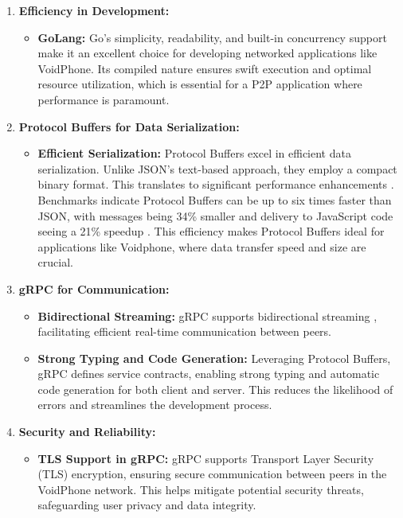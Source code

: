 \begin{enumerate}
    \item \textbf{Efficiency in Development:}
    \begin{itemize}
        \item \textbf{GoLang:} Go's simplicity, readability, and built-in concurrency support make it an excellent choice for developing networked applications like VoidPhone. Its compiled nature ensures swift execution and optimal resource utilization, which is essential for a P2P application where performance is paramount.
    \end{itemize}
    
    \item \textbf{Protocol Buffers for Data Serialization:}
    \begin{itemize}
        \item \textbf{Efficient Serialization:} Protocol Buffers excel in efficient data serialization. Unlike JSON's text-based approach, they employ a compact binary format. This translates to significant performance enhancements \parencite{hardwareAcceleratorProtocolBuffers}. Benchmarks indicate Protocol Buffers can be up to six times faster than JSON, with messages being 34\% smaller and delivery to JavaScript code seeing a 21\% speedup \parencite{beatingJSONWithProtobuf}. This efficiency makes Protocol Buffers ideal for applications like Voidphone, where data transfer speed and size are crucial.
    \end{itemize}
    
    \item \textbf{gRPC for Communication:}
    \begin{itemize}
        \item \textbf{Bidirectional Streaming:} gRPC supports bidirectional streaming \parencite{grpcCoreConcepts}, facilitating efficient real-time communication between peers.
        \item \textbf{Strong Typing and Code Generation:} Leveraging Protocol Buffers, gRPC defines service contracts, enabling strong typing and automatic code generation for both client and server. This reduces the likelihood of errors and streamlines the development process.
    \end{itemize}
    
    \item \textbf{Security and Reliability:}
    \begin{itemize}
        \item \textbf{TLS Support in gRPC:} gRPC supports Transport Layer Security (TLS) encryption, ensuring secure communication between peers in the VoidPhone network. This helps mitigate potential security threats, safeguarding user privacy and data integrity.
    \end{itemize}
\end{enumerate}

